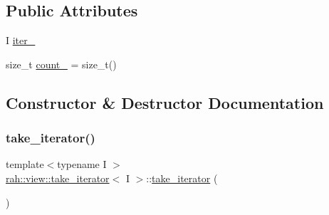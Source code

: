 \subsection*{Public Attributes}
\begin{DoxyCompactItemize}
\item 
I \mbox{\hyperlink{structrah_1_1view_1_1take__iterator_abbc947797abfa6ecaeb91c8185212152}{iter\+\_\+}}
\item 
size\+\_\+t \mbox{\hyperlink{structrah_1_1view_1_1take__iterator_a7d7c6fd1c6eed6192f1f51da04d5ede1}{count\+\_\+}} = size\+\_\+t()
\end{DoxyCompactItemize}


\subsection{Constructor \& Destructor Documentation}
\mbox{\label{structrah_1_1view_1_1take__iterator_a0df2b333ea2a0deb3db7c84d12ebbaca}} 
\subsubsection{\texorpdfstring{take\_iterator()}{take\_iterator()}\hspace{0.1cm}{\footnotesize\ttfamily [1/2]}}
{\footnotesize\ttfamily template$<$typename I $>$ \\
\mbox{\hyperlink{structrah_1_1view_1_1take__iterator}{rah\+::view\+::take\+\_\+iterator}}$<$ I $>$\+::\mbox{\hyperlink{structrah_1_1view_1_1take__iterator}{take\+\_\+iterator}} (\begin{DoxyParamCaption}{ }\end{DoxyParamCaption})\hspace{0.3cm}{\ttfamily [default]}}

\mbox{\label{structrah_1_1view_1_1take__iterator_ad818949f1227e0676a9c1ad35860cf46}} 
